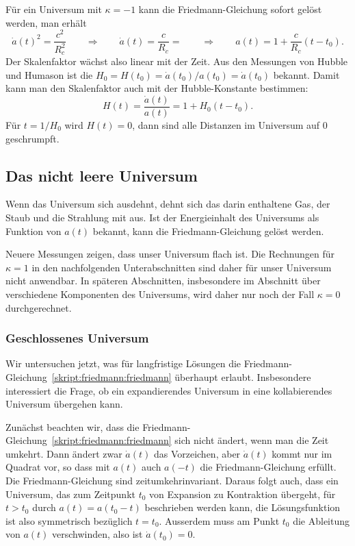Für ein Universum mit $\kappa=-1$ kann die Friedmann-Gleichung sofort
gelöst werden, man erhält
\[
\dot a(t)^2
=
\frac{c^2}{R_c^2}
\qquad\Rightarrow\qquad
\dot a(t) = \frac{c}{R_c} = 
\qquad\Rightarrow\qquad
a(t)= 1 + \frac{c}{R_c}(t-t_0).
\]
Der Skalenfaktor wächst also linear mit der Zeit.
Aus den Messungen von Hubble und Humason ist die
$H_0=H(t_0)=\dot a(t_0)/a(t_0)=\dot a(t_0)$
bekannt.
Damit kann man den Skalenfaktor auch mit der Hubble-Konstante
bestimmen:
\[
H(t) =  \frac{\dot a(t)}{a(t)} = 1 + H_0(t-t_0).
\]
Für $t=1/H_0$ wird $H(t)=0$, dann sind alle Distanzen im
Universum auf $0$ geschrumpft.


\subsection{Das nicht leere Universum}
Wenn das Universum sich ausdehnt, dehnt sich das darin enthaltene
Gas, der Staub und die Strahlung mit aus.
Ist der Energieinhalt des Universums als Funktion von $a(t)$ bekannt,
kann die Friedmann-Gleichung gelöst werden.

Neuere Messungen zeigen, dass unser Universum flach ist.
Die Rechnungen für $\kappa=1$ in den nachfolgenden Unterabschnitten
sind daher für unser Universum nicht anwendbar.
In späteren Abschnitten, insbesondere im Abschnitt über verschiedene
Komponenten des Universums, wird daher nur noch der Fall $\kappa=0$
durchgerechnet.

\subsubsection{Geschlossenes Universum}
Wir untersuchen jetzt, was für langfristige Lösungen die
Friedmann-Gleichung~\eqref{skript:friedmann:friedmann}
überhaupt erlaubt.
Insbesondere interessiert die Frage, ob ein expandierendes Universum
in eine kollabierendes Universum übergehen kann.

Zunächst beachten wir, dass die 
Friedmann-Gleichung~\eqref{skript:friedmann:friedmann}
sich nicht ändert, wenn man die Zeit umkehrt.
Dann ändert zwar $\dot a(t)$ das Vorzeichen, aber $\dot a(t)$ kommt
nur im Quadrat vor, so dass mit $a(t)$ auch $a(-t)$ die Friedmann-Gleichung
erfüllt.
Die Friedmann-Gleichung sind zeitumkehrinvariant.
Daraus folgt auch, dass ein Universum, das zum Zeitpunkt $t_0$
von Expansion zu Kontraktion übergeht, für $t>t_0$ durch
$a(t)=a(t_0-t)$ beschrieben werden kann, die Lösungsfunktion ist
also symmetrisch bezüglich $t=t_0$.
Ausserdem muss
am Punkt $t_0$ die Ableitung von $a(t)$ verschwinden, also ist
$\dot a(t_0)=0$.

